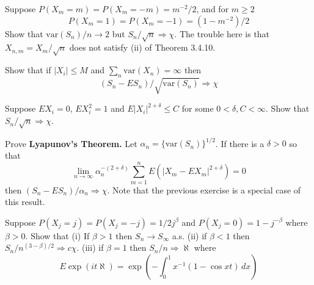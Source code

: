   \begin{exercise}[Durrett 3.4.9]
    Suppose $P(X_m = m) = P(X_m = -m) = m^{-2}/2$, and for $m \geq 2$
    \begin{equation*}
      P(X_m = 1) = P(X_m = -1) = (1 - m^{-2})/2
    \end{equation*}
    Show that $\text{var}(S_n)/n \to 2$ but $S_n/\sqrt{n} \Rightarrow \chi$. The trouble here is that $X_{n,m} = X_m/\sqrt{n}$ does not satisfy (ii) of Theorem 3.4.10.
  \end{exercise}
  \begin{solution}

  \end{solution}

  \begin{exercise}[Durrett 3.4.10]
    Show that if $|X_i| \leq M$ and $\sum_n \text{var}(X_n) = \infty$ then
    \begin{equation*}
      (S_n - ES_n)/\sqrt{\text{var}(S_n)} \Rightarrow \chi
    \end{equation*}
  \end{exercise}
  \begin{solution}

  \end{solution}

  \begin{exercise}[Durrett 3.4.11]
    Suppose $EX_i = 0$, $EX_i^2 = 1$ and $E|X_i|^{2+\delta} \leq C$ for some $0 < \delta, C < \infty$. Show that $S_n/\sqrt{n} \Rightarrow \chi$.
  \end{exercise}
  \begin{solution}

  \end{solution}

  \begin{exercise}[Durrett 3.4.12]
    Prove \textbf{Lyapunov's Theorem.} Let $\alpha_n = \{\text{var}(S_n)\}^{1/2}$. If there is a $\delta > 0$ so that
    \begin{equation*}
      \lim_{n \to \infty} \alpha_n^{-(2+\delta)} \sum_{m=1}^n E(|X_m - EX_m|^{2+\delta}) = 0
    \end{equation*}
    then $(S_n - ES_n)/\alpha_n \Rightarrow \chi$. Note that the previous exercise is a special case of this result.
  \end{exercise}
  \begin{solution}

  \end{solution}

  \begin{exercise}[Durrett 3.4.13]
    Suppose $P(X_j = j) = P(X_j = -j) = 1/2j^\beta$ and $P(X_j = 0) = 1 - j^{-\beta}$ where $\beta > 0$. Show that (i) If $\beta > 1$ then $S_n \to S_\infty$ a.s. (ii) if $\beta < 1$ then $S_n/n^{(3-\beta)/2} \Rightarrow c\chi$. (iii) if $\beta = 1$ then $S_n/n \Rightarrow \aleph$ where
    \begin{equation*}
      E \exp(it\aleph) = \exp \left( -\int_0^1 x^{-1}(1 - \cos xt) \, dx \right)
    \end{equation*}
  \end{exercise}
  \begin{solution}

  \end{solution}

